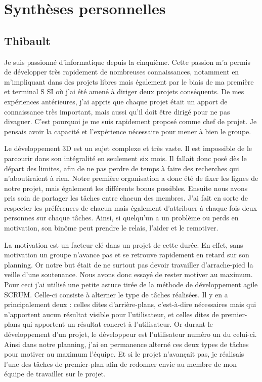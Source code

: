 \documentclass[11pt]{report}
\begin{document}
\chapter{Synthèses personnelles}

\section{Thibault}

Je suis passionné d’informatique depuis la cinquième. Cette passion m’a permis de développer très rapidement de nombreuses connaissances, notamment en m’impliquant dans des projets libres mais également par le biais de ma première et terminal S SI où j’ai été amené à diriger deux projets conséquents. De mes expériences antérieures, j’ai appris que chaque projet était un apport de connaissance très important, mais aussi qu’il doit être dirigé pour ne pas divaguer. C’est pourquoi je me suis rapidement proposé comme chef de projet. Je pensais avoir la capacité et l’expérience nécessaire pour mener à bien le groupe.

Le développement 3D est un sujet complexe et très vaste. Il est impossible de le parcourir dans son intégralité en seulement six mois. Il fallait donc posé dès le départ des limites, afin de ne pas perdre de temps à faire des recherches qui n’aboutiraient à rien. Notre première organisation a donc été de fixer les lignes de notre projet, mais également les différents bonus possibles. Ensuite nous avons pris soin de partager les tâches entre chacun des membres. J’ai fait en sorte de respecter les préférences de chacun mais également d’attribuer à chaque fois deux personnes sur chaque tâches. Ainsi, si quelqu’un a un problème ou perds en motivation, son binôme peut prendre le relais, l’aider et le remotiver.

La motivation est un facteur clé dans un projet de cette durée. En effet, sans motivation un groupe n’avance pas et se retrouve rapidement en retard sur son planning. Or notre but était de ne surtout pas devoir travailler d’arrache-pied la veille d’une soutenance. Nous avons donc essayé de rester motiver au maximum. Pour ceci j’ai utilisé une petite astuce tirée de la méthode de développement agile SCRUM. Celle-ci consiste à alterner le type de tâches réalisées. Il y en a principalement deux : celles dites d’arrière-plans, c’est-à-dire nécessaires mais qui n’apportent aucun résultat visible pour l’utilisateur, et celles dites de premier-plans qui apportent un résultat concret à l’utilisateur. Or durant le développement d’un projet, le développeur est l’utilisateur numéro un du celui-ci. Ainsi dans notre planning, j’ai en permanence alterné ces deux types de tâches pour motiver au maximum l’équipe. Et si le projet n’avançait pas, je réalisais l’une des tâches de premier-plan afin de redonner envie au membre de mon équipe de travailler sur le projet.
\end{document}
